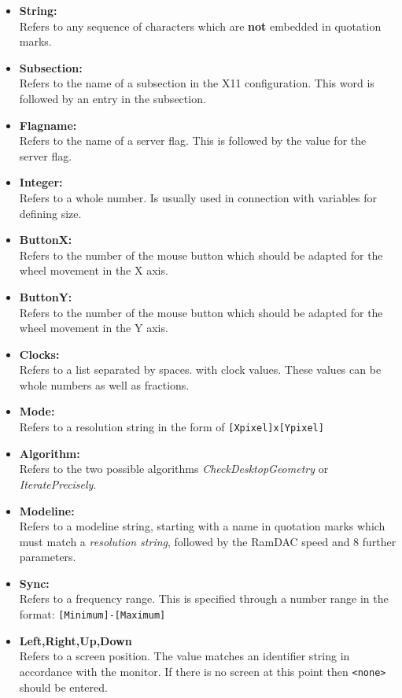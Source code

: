 \begin{itemize}
\item \textbf{String:}\\
Refers to any sequence of characters which are \textbf{not}
embedded in quotation marks. 
\item \textbf{Subsection:}\\
Refers to the name of a subsection in the X11 configuration.
This word is followed by an entry in the subsection.
\item \textbf{Flagname:}\\
Refers to the name of a server flag. This is followed by the value for the 
server flag.
\item \textbf{Integer:}\\
Refers to a whole number. Is usually used in connection with variables for
defining size. 
\item \textbf{ButtonX:}\\
Refers to the number of the mouse button which should be adapted for the wheel
movement in the X axis.
\item \textbf{ButtonY:}\\
Refers to the number of the mouse button which should be adapted for the wheel
movement in the Y axis.
\item \textbf{Clocks:}\\
Refers to a list separated by spaces. with clock values. These values can be
whole numbers as well as fractions. 
\item \textbf{Mode:}\\
Refers to a resolution string in the form of \verb+[Xpixel]x[Ypixel]+
\item \textbf{Algorithm:}\\
Refers to the two possible algorithms
\textit{CheckDesktopGeometry} or \textit{IteratePrecisely}.
\item \textbf{Modeline:}\\
Refers to a modeline string, starting with a name in quotation marks which
must match a \textit{resolution string}, followed by the RamDAC speed and 8
further parameters. 
\item \textbf{Sync:}\\
Refers to a frequency range. This is specified through a number range in the
format:  \verb+[Minimum]-[Maximum]+ 
\item \textbf{Left,Right,Up,Down}\\
Refers to a screen position. The value matches an identifier string in
accordance with the monitor. If there is no screen at this point then
\verb+<none>+ should be entered.
\end{itemize}

